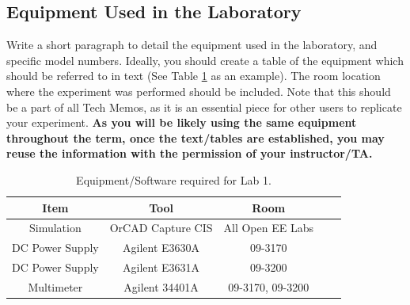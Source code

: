 \documentclass[11pt]{article}
\begin{document}
\subsection{Equipment Used in the Laboratory}
Write a short paragraph to detail the equipment used in the laboratory, and specific model numbers. Ideally, you should create a table of the equipment which should be referred to in text (See Table \ref{Table:Equipment} as an example).  The room location where the experiment was performed should be included.  Note that this should be a part of all Tech Memos, as it is an essential piece for other users to replicate your experiment.  \textbf{As you will be likely using the same equipment throughout the term, once the text/tables are established, you may reuse the information with the permission of your instructor/TA.}		
	\begin{table}[h!]
		\centering
		\caption{Equipment/Software required for Lab 1.}
		\label{Table:Equipment}
		\begin{tabular}{|c||c|c|c|c|}
			\hline
			Item & Tool & Room      \\
			\hline
			Simulation & OrCAD Capture CIS & All Open EE Labs   \\	 
			\hline 
			DC Power Supply&  Agilent E3630A  & 09-3170   \\	
			\hline  
			DC Power Supply & Agilent E3631A   & 09-3200 \\ 
			\hline 
			Multimeter & Agilent 34401A & 09-3170, 09-3200 \\
			\hline
		\end{tabular}
	\end{table}
\end{document}
